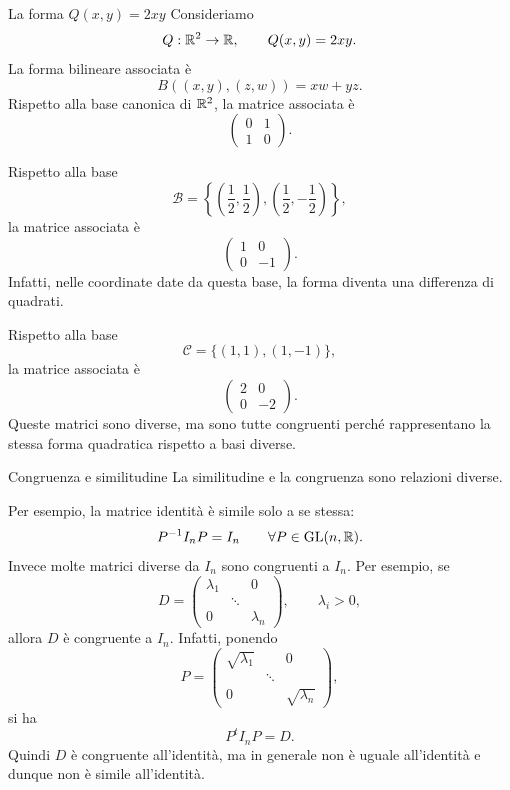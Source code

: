\documentclass[a4paper]{article}
\begin{document}
\begin{snippetexample}{La forma \(Q(x,y)=2xy\)}
    Consideriamo
    \[
        Q:\mathbb{R}^2\to\mathbb{R},
        \qquad
        Q(x,y)=2xy.
    \]
    La forma bilineare associata è
    \[
        B((x,y),(z,w))=xw+yz.
    \]
    Rispetto alla base canonica di \(\mathbb{R}^2\), la matrice associata è
    \[
        \begin{pmatrix}
            0 & 1\\
            1 & 0
        \end{pmatrix}.
    \]

    Rispetto alla base
    \[
        \mathcal{B}
        =
        \left\{
            \left(\frac{1}{2},\frac{1}{2}\right),
            \left(\frac{1}{2},-\frac{1}{2}\right)
        \right\},
    \]
    la matrice associata è
    \[
        \begin{pmatrix}
            1 & 0\\
            0 & -1
        \end{pmatrix}.
    \]
    Infatti, nelle coordinate date da questa base, la forma diventa una differenza di quadrati.

    Rispetto alla base
    \[
        \mathcal{C}
        =
        \{(1,1),(1,-1)\},
    \]
    la matrice associata è
    \[
        \begin{pmatrix}
            2 & 0\\
            0 & -2
        \end{pmatrix}.
    \]
    Queste matrici sono diverse, ma sono tutte congruenti perché rappresentano la stessa forma quadratica rispetto a basi diverse.
\end{snippetexample}

\begin{snippetremark}{Congruenza e similitudine}
    La similitudine e la congruenza sono relazioni diverse.

    Per esempio, la matrice identità è simile solo a se stessa:
    \[
        P^{-1}I_nP=I_n
        \qquad
        \forall P\in\operatorname{GL}(n,\mathbb{R}).
    \]
    Invece molte matrici diverse da \(I_n\) sono congruenti a \(I_n\). Per esempio, se
    \[
        D=
        \begin{pmatrix}
            \lambda_1 & & 0\\
            & \ddots & \\
            0 & & \lambda_n
        \end{pmatrix},
        \qquad
        \lambda_i>0,
    \]
    allora \(D\) è congruente a \(I_n\). Infatti, ponendo
    \[
        P=
        \begin{pmatrix}
            \sqrt{\lambda_1} & & 0\\
            & \ddots & \\
            0 & & \sqrt{\lambda_n}
        \end{pmatrix},
    \]
    si ha
    \[
        P^tI_nP=D.
    \]
    Quindi \(D\) è congruente all'identità, ma in generale non è uguale all'identità e dunque non è simile all'identità.
\end{snippetremark}
\end{document}
